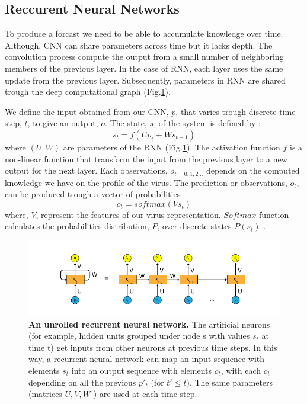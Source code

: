 \documentclass[12pt]{article}
\begin{document}
\subsection{Reccurent Neural Networks}
To produce a forcast we need to be able to accumulate knowledge over time. Although, CNN can share parameters across time but it lacks depth. The convolution process compute the output from a small number of neighboring members of the previous layer. In the case of RNN, each layer uses the same update from the previous layer. Subsequently, parameters in RNN are shared trough the deep computational graph (Fig.\ref{fig:RNN}).

We define the input obtained from our CNN, $p$, that varies trough discrete time step, $t$, to give an output, $o$. The state, $s$, of the system is defined by :
$$s_t = f(Up_t+ Ws_{t-1})$$ where $(U,W)$ are parameters of the RNN (Fig.\ref{fig:RNN}). The activation function $f$ is a non-linear function that transform the input from the previous layer to a new output for the next layer. Each observations, $o_{t=0,1,2 ... }$ depends on the computed knowledge we have on the profile of the virus. The prediction or observations, $o_t$, can be produced trough a vector of probabilities  $$o_t=softmax(Vs_t)$$ where, $V$, represent the features of our virus representation. $Softmax$ function calculates the probabilities distribution, $P$, over discrete states $P(s_t)$ .

\begin{figure}[h]
    \centering
    \includegraphics[width=\textwidth]{figure-3.png}
    \caption{ \textbf{An unrolled recurrent neural network.} The artificial neurons (for example, hidden units grouped under node s with values $s_t$ at time t) get inputs from other neurons at previous time steps. In this way, a recurrent neural network can map an input sequence with elements $s_t$ into an output sequence with elements $o_t$, with each $o_t$ depending on all the previous $p'_t$ (for $t'\leq t$). The same parameters (matrices $U,V,W$ ) are used at each time step. }
    \label{fig:RNN}
\end{figure}
\end{document}
